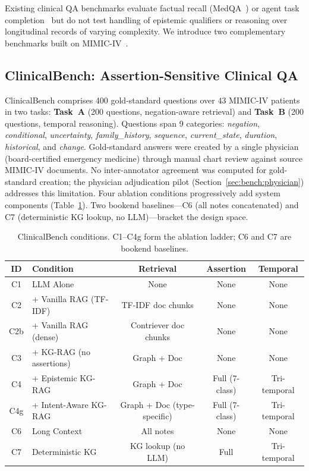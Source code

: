 
Existing clinical QA benchmarks evaluate factual recall (MedQA~\cite{jin2021medqa}) or agent task completion~\cite{medagentbench2025} but do not test handling of epistemic qualifiers or reasoning over longitudinal records of varying complexity.
We introduce two complementary benchmarks built on MIMIC-IV~\cite{johnson2023mimiciv}.


\subsection{ClinicalBench: Assertion-Sensitive Clinical QA}
\label{sec:bench:clinicalbench}

ClinicalBench comprises 400 gold-standard questions over 43 MIMIC-IV patients in two tasks: \textbf{Task~A} (200 questions, negation-aware retrieval) and \textbf{Task~B} (200 questions, temporal reasoning).
Questions span 9 categories: \textit{negation}, \textit{conditional}, \textit{uncertainty}, \textit{family\_history}, \textit{sequence}, \textit{current\_state}, \textit{duration}, \textit{historical}, and \textit{change}.
Gold-standard answers were created by a single physician (board-certified emergency medicine) through manual chart review against source MIMIC-IV documents.
No inter-annotator agreement was computed for gold-standard creation; the physician adjudication pilot (Section~\ref{sec:bench:physician}) addresses this limitation.
Four ablation conditions progressively add system components (Table~\ref{tab:clinicalbench_conditions}).
Two bookend baselines---C6 (all notes concatenated) and C7 (deterministic KG lookup, no LLM)---bracket the design space.

\begin{table}[t]
\centering
\footnotesize
\caption{ClinicalBench conditions. C1--C4g form the ablation ladder; C6 and C7 are bookend baselines.}
\label{tab:clinicalbench_conditions}
\setlength{\tabcolsep}{4pt}
\begin{tabular}{@{}clccc@{}}
\toprule
ID & Condition & Retrieval & Assertion & Temporal \\
\midrule
C1 & LLM Alone & None & None & None \\
C2 & + Vanilla RAG (TF-IDF) & TF-IDF doc chunks & None & None \\
C2b & + Vanilla RAG (dense) & Contriever doc chunks & None & None \\
C3 & + KG-RAG (no assertions) & Graph + Doc & None & None \\
C4 & + Epistemic KG-RAG & Graph + Doc & Full (7-class) & Tri-temporal \\
C4g & + Intent-Aware KG-RAG & Graph + Doc (type-specific) & Full (7-class) & Tri-temporal \\
\midrule
C6 & Long Context & All notes & None & None \\
C7 & Deterministic KG & KG lookup (no LLM) & Full & Tri-temporal \\
\bottomrule
\end{tabular}
\end{table}

